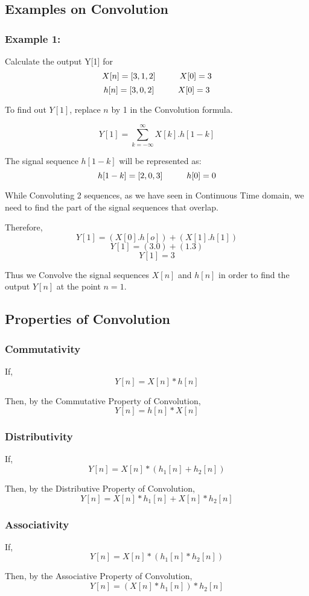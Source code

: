 \subsection{Examples on Convolution}
\subsubsection{Example 1:}

Calculate the output Y[1] for 
$$X[n]=[3,1,2]\hspace{10mm}X[0]=3$$
$$h[n]=[3,0,2]\hspace{10mm}X[0]=3$$

To find out $Y[1]$, replace $n$ by 1 in the Convolution formula.

$$Y[1]=\sum_{k=-\infty}^{\infty} X[k].h[1-k]$$

The signal sequence $h[1-k]$ will be represented as:
$$h[1-k]=[2,0,3]\hspace{10mm}h[0]=0$$

While Convoluting 2 sequences, as we have seen in Continuous Time domain, we need to find the part of the signal sequences that overlap. 

Therefore,
$$Y[1]=(X[0].h[o])+(X[1].h[1])$$
$$Y[1]=(3.0)+(1.3)$$
$$Y[1]=3$$

Thus we Convolve the signal sequences $X[n]$ and $h[n]$ in order to find the output $Y[n]$ at the point $n=1$.

\subsection{Properties of Convolution}
\subsubsection{Commutativity}
If, $$Y[n]=X[n]*h[n]$$

Then, by the Commutative Property of Convolution, 
$$Y[n]=h[n]*X[n]$$

\subsubsection{Distributivity}

If, $$Y[n]=X[n]*(h_1[n]+h_2[n])$$

Then, by the Distributive Property of Convolution, 
$$Y[n]=X[n]*h_1[n]+X[n]*h_2[n]$$

\subsubsection{Associativity}

If, $$Y[n]=X[n]*(h_1[n]*h_2[n])$$

Then, by the Associative Property of Convolution, 
$$Y[n]=(X[n]*h_1[n])*h_2[n]$$





